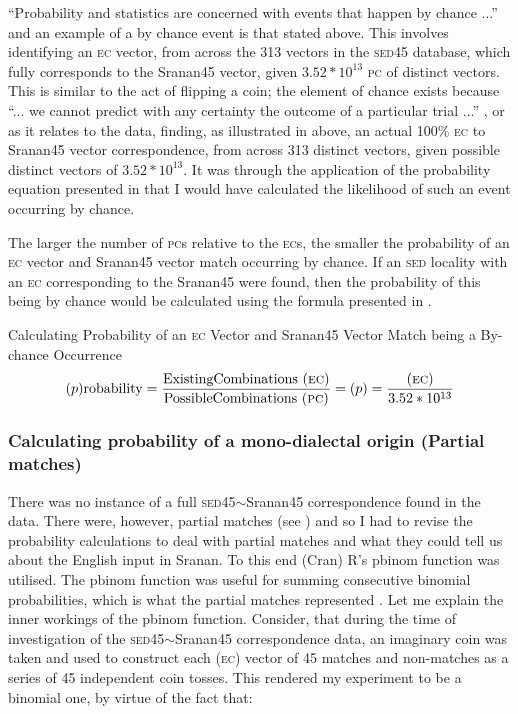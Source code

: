 {{{{{{{{{``Probability and statistics are concerned with events that happen by chance ...''  \citep[1]{DeCoursey03} and an example of a by chance event is that stated above. This involves identifying an \textsc{ec} vector, from across the 313 vectors in the \textsc{sed45} database, which fully corresponds to the Sranan45 vector, given $3.52\ast10^{13}$ \textsc{pc} of distinct vectors. This is similar to the act of flipping a coin; the element of chance exists because ``... we cannot predict with any certainty the outcome of a particular trial ...'' \citep[1]{DeCoursey03}, or as it relates to the data, finding, as illustrated in  above, an actual 100\% \textsc{ec} to Sranan45 vector correspondence, from across 313 distinct vectors, given possible distinct vectors of $3.52\ast10^{13}$. It was through the application of the probability equation presented in  that I would have calculated the likelihood of such an event occurring by chance.

The larger the number of \textsc{pc}s relative to the \textsc{ec}s, the smaller the probability of an \textsc{ec} vector and Sranan45 vector match occurring by chance. If an \textsc{sed} locality with an \textsc{ec} corresponding to the Sranan45 were found, then the probability of this being by chance would be calculated using the formula presented in .

% 
\ea
{Calculating Probability of an \textsc{ec} Vector and Sranan45 Vector Match being a By-chance Occurrence}
\[
\text{($p$)robability} = \frac{\text{ExistingCombinations (\textsc{ec})}}{\text{PossibleCombinations (\textsc{pc})}} = (p) = \frac{(\textsc{ec})}{3.52\ast10^{13}}
\]
\label{exTable 3.12}
\z

\subsubsection{Calculating probability of a mono-dialectal origin (Partial matches)} \label{3.4.3.2}
There was no instance of a full \textsc{sed45}$\sim$Sranan45 correspondence found in the data. There were, however, partial matches (see ) and so I had to revise the probability calculations to deal with partial matches and what they could tell us about the English input in Sranan. To this end (Cran) R's pbinom function was utilised. The pbinom function was useful for summing consecutive binomial probabilities, which is what the partial matches represented \citep{Larget07}. Let me explain the inner workings of the pbinom function. Consider, that during the time of investigation of the \textsc{sed45}$\sim$Sranan45 correspondence data, an imaginary coin was taken and used to construct each (\textsc{ec}) vector of 45 matches and non-matches as a series of 45 independent coin tosses. This rendered my experiment to be a binomial one, by virtue of the fact that:

}}}}}}}}}
